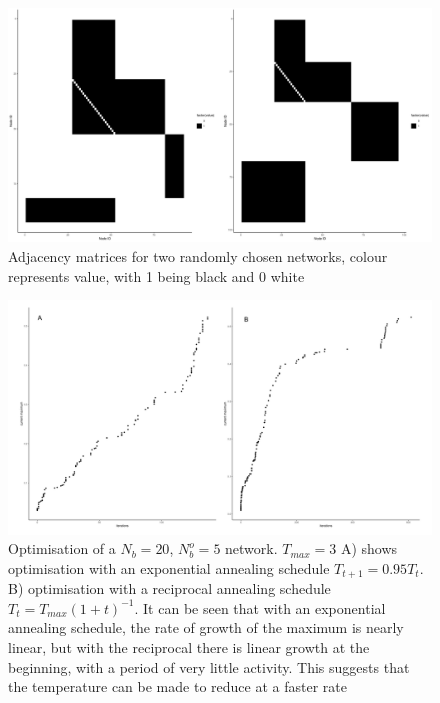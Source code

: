 \documentclass[9pt,twocolumn,twoside,lineno]{pnas-new}
\begin{document}
\begin{figure}%
\centering
\includegraphics[width=.8\linewidth]{figures/block}
\caption{Adjacency matrices for two randomly chosen networks, colour represents value, with 1 being black and 0 white}
\label{fig:GD_adj}
\end{figure}

\begin{figure}%
\centering
\includegraphics[width=.9\linewidth]{figures/SA_sched_comp}
\caption{Optimisation of a $N_b=20$,  $N_b^o=5$ network. $T_{max} = 3$ A) shows optimisation with an exponential annealing schedule $T_{t+1} = 0.95 T_{t}$. B) optimisation with a reciprocal annealing schedule $T_{t} = T_{max}({1 + t})^{-1}$. It can be seen that with an exponential annealing schedule, the rate of growth of the maximum is nearly linear, but with the reciprocal there is linear growth at the beginning, with a period of very little activity. This suggests that the temperature can be made to reduce at a faster rate}
\label{fig:SA_max_naive}
\end{figure}
\end{document}
